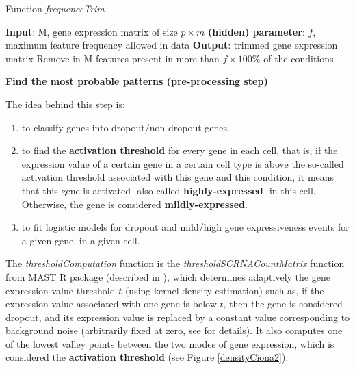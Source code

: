 \documentclass{report}
\begin{document}
{\begin{algorithm}[H]
\caption{Function \emph{frequenceTrim}}
\begin{algorithmic}
\STATE \textbf{Input}: M, gene expression matrix of size $p \times m$
\STATE \textbf{(hidden) parameter}: $f$, maximum feature frequency allowed in data
\STATE \textbf{Output}: trimmed gene expression matrix
\STATE Remove in M features present in more than $f \times 100 \%$ of the conditions
\end{algorithmic}
\end{algorithm}

\bigskip
\noindent \textbf{Find the most probable patterns (pre-processing step)}
\bigskip

The idea behind this step is:

\begin{enumerate}
\item to classify genes into dropout/non-dropout genes.
\item to find the \textbf{activation threshold} for every gene in each cell, that is, if the expression value of a certain gene in a certain cell type is above the so-called activation threshold associated with this gene and this condition, it means that this gene is activated -also called \textbf{highly-expressed}- in this cell. Otherwise, the gene is considered \textbf{mildly-expressed}. 
\item to fit logistic models for dropout and mild/high gene expressiveness events for a given gene, in a given cell.
\end{enumerate}

The \textit{thresholdComputation} function is the \textit{thresholdSCRNACountMatrix} function from MAST R package (described in \cite{finak2015mast}), which determines adaptively the gene expression value threshold $t$ (using kernel density estimation) such as, if the expression value associated with one gene is below $t$, then the gene is considered dropout, and its expression value is replaced by a constant value corresponding to background noise (arbitrarily fixed at zero, see \cite{finak2015mast} for details). It also computes one of the lowest valley points between the two modes of gene expression, which is considered the \textbf{activation threshold} (see Figure \ref{densityCiona2}).\\

}
\end{document}
